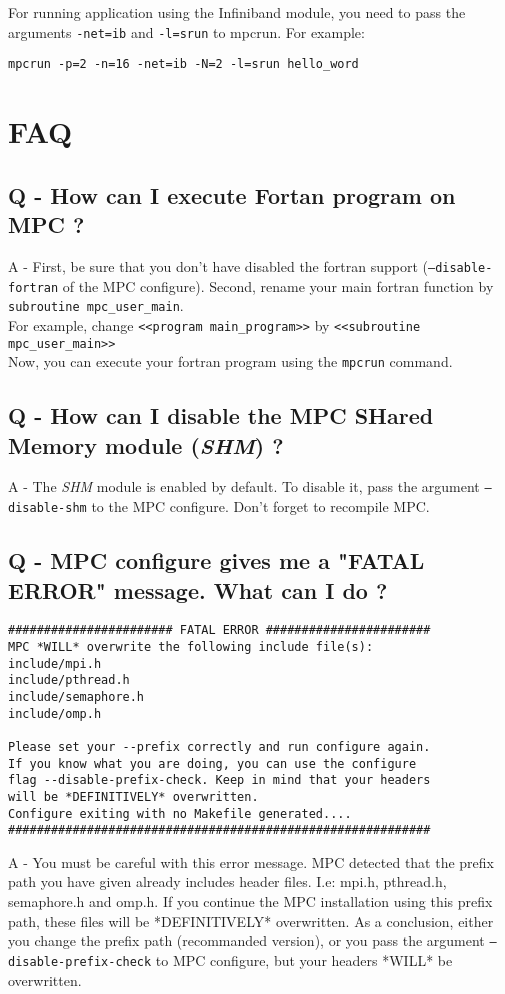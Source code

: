 \documentclass[a4paper,11pt]{article}
\begin{document}
For running application using the Infiniband module, you need to pass the arguments \texttt{-net=ib} and \texttt{-l=srun} to mpcrun. For example:
\begin{verbatim}
mpcrun -p=2 -n=16 -net=ib -N=2 -l=srun hello_word
\end{verbatim}

\section{FAQ}
\label{sec:faq}
\subsection*{Q - How can I execute Fortan program on MPC ?}
A - First, be sure that you don't have disabled the fortran support (\texttt{--disable-fortran} of the MPC configure).
Second, rename your main fortran function by {\tt subroutine mpc\_user\_main}.\\
For example, change {\tt{\textless}{\textless}program main\_program{\textgreater}{\textgreater}} by {\tt{\textless}{\textless}subroutine mpc\_user\_main{\textgreater}{\textgreater}}\\
Now, you can execute your fortran program using the \texttt{mpcrun} command.

\subsection*{Q - How can I disable the MPC SHared Memory module (\emph{SHM}) ?}
A - The \emph{SHM} module is enabled by default. To disable it, pass the argument {\tt--disable-shm} to the MPC configure. Don't forget to recompile MPC.

\subsection*{Q - MPC configure gives me a "FATAL ERROR" message. What can I do ?}
\begin{verbatim}
####################### FATAL ERROR #######################
MPC *WILL* overwrite the following include file(s):
include/mpi.h
include/pthread.h
include/semaphore.h
include/omp.h

Please set your --prefix correctly and run configure again.
If you know what you are doing, you can use the configure
flag --disable-prefix-check. Keep in mind that your headers
will be *DEFINITIVELY* overwritten.
Configure exiting with no Makefile generated....
###########################################################
\end{verbatim}
A - You must be careful with this error message. MPC detected that the prefix path you have given already includes header files. I.e: mpi.h, pthread.h, semaphore.h and omp.h.
If you continue the MPC installation using this prefix path, these files will be *DEFINITIVELY* overwritten.
As a conclusion, either you change the prefix path (recommanded version), or you pass the argument {\tt --disable-prefix-check} to MPC configure, but your headers *WILL* be overwritten.
\end{document}
